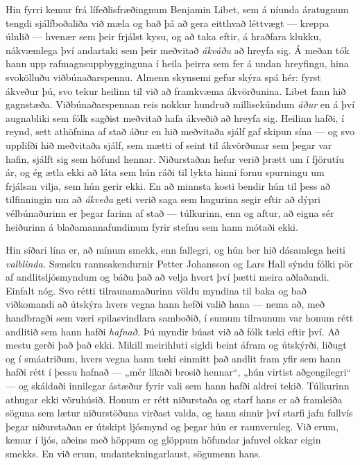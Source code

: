 Hin fyrri kemur frá lífeðlisfræðingnum Benjamin Libet, sem á níunda áratugnum tengdi sjálfboðaliða við mæla og bað þá að gera eitthvað léttvægt — kreppa úlnlið — hvenær sem þeir frjálst kysu, og að taka eftir, á hraðfara klukku, nákvæmlega því andartaki sem þeir meðvitað \emph{ákváðu} að hreyfa sig. Á meðan tók hann upp rafmagnsuppbygginguna í heila þeirra sem fer á undan hreyfingu, hina svokölluðu viðbúnaðarspennu. Almenn skynsemi gefur skýra spá hér: fyrst ákveður þú, svo tekur heilinn til við að framkvæma ákvörðunina. Libet fann hið gagnstæða. Viðbúnaðarspennan reis nokkur hundruð millisekúndum \emph{áður} en á því augnabliki sem fólk sagðist meðvitað hafa ákveðið að hreyfa sig. Heilinn hafði, í reynd, sett athöfnina af stað áður en hið meðvitaða sjálf gaf skipun sína — og svo upplifði hið meðvitaða sjálf, sem mætti of seint til ákvörðunar sem þegar var hafin, sjálft sig sem höfund hennar. Niðurstaðan hefur verið þrætt um í fjörutíu ár, og ég ætla ekki að láta sem hún ráði til lykta hinni fornu spurningu um frjálsan vilja, sem hún gerir ekki. En að minnsta kosti bendir hún til þess að tilfinningin um að \emph{ákveða} geti verið saga sem hugurinn segir eftir að dýpri vélbúnaðurinn er þegar farinn af stað — túlkurinn, enn og aftur, að eigna sér heiðurinn á blaðamannafundinum fyrir stefnu sem hann mótaði ekki.

Hin síðari lína er, að mínum smekk, enn fallegri, og hún ber hið dásamlega heiti \emph{valblinda.} Sænsku rannsakendurnir Petter Johansson og Lars Hall sýndu fólki pör af andlitsljósmyndum og báðu það að velja hvort því þætti meira aðlaðandi. Einfalt nóg. Svo rétti tilraunamaðurinn völdu myndina til baka og bað viðkomandi að útskýra hvers vegna hann hefði valið hana — nema að, með handbragði sem væri spilasvindlara samboðið, í sumum tilraunum var honum rétt andlitið sem hann hafði \emph{hafnað.} Þú myndir búast við að fólk tæki eftir því. Að mestu gerði það það ekki. Mikill meirihluti sigldi beint áfram og útskýrði, liðugt og í smáatriðum, hvers vegna hann tæki einmitt það andlit fram yfir sem hann hafði rétt í þessu hafnað — „mér líkaði brosið hennar“, „hún virtist aðgengilegri“ — og skáldaði innilegar ástæður fyrir vali sem hann hafði aldrei tekið. Túlkurinn athugar ekki vöruhúsið. Honum er rétt niðurstaða og starf hans er að framleiða söguna sem lætur niðurstöðuna virðast valda, og hann sinnir því starfi jafn fullvís þegar niðurstaðan er útskipt ljósmynd og þegar hún er raunveruleg. Við erum, kemur í ljós, aðeins með höppum og glöppum höfundar jafnvel okkar eigin smekks. En við erum, undantekningarlaust, sögumenn hans.


